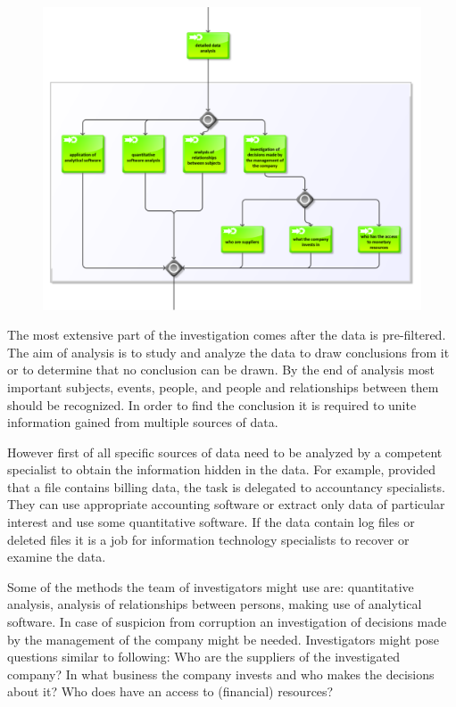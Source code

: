 \begin{figure}[hb!t]
	\begin{center} 
	\includegraphics[width=1.0\textwidth]{img/metodika/metodika3.pdf}
	\end{center}
\end{figure}

The most extensive part of the investigation comes after the data is pre-filtered. The aim of analysis is to study and analyze the data to draw conclusions from it or to determine that no conclusion can be drawn. By the end of analysis most important subjects, events, people, and people and relationships between them should be recognized. In order to find the conclusion it is required to unite information gained from multiple sources of data.

However first of all specific sources of data need to be analyzed by a competent specialist to obtain the information hidden in the data. For example, provided that a file contains billing data, the task is delegated to accountancy specialists. They can use appropriate accounting software or extract only data of particular interest and use some quantitative software. If the data contain log files or deleted files it is a job for information technology specialists to recover or examine the data. 


Some of the methods the team of investigators might use are: quantitative analysis, analysis of relationships between persons, making use of analytical software. In case of  suspicion from corruption an investigation of decisions made by the management of the company might be needed. Investigators might pose questions similar to following: Who are the suppliers of the investigated company? In what business the company invests and who makes the decisions about it? Who does have an access to (financial) resources?

